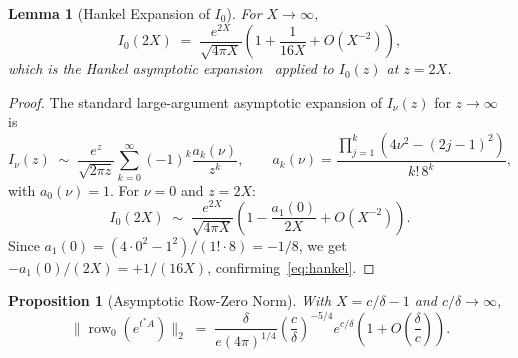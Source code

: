 \documentclass[11pt,reqno]{article}
\theoremstyle{plain}
\newtheorem{lemma}[theorem]{Lemma}
\newtheorem{proposition}[theorem]{Proposition}
\theoremstyle{definition}
\theoremstyle{remark}
\numberwithin{equation}{section}
\begin{document}
\begin{lemma}[Hankel Expansion of $I_0$]\label{lem:hankel}
For $X \to \infty$,
\begin{equation}\label{eq:hankel}
  I_0(2X) \;=\; \frac{e^{2X}}{\sqrt{4\pi X}} \left(1 + \frac{1}{16X} + O(X^{-2})\right),
\end{equation}
which is the Hankel asymptotic expansion~\cite[10.40.1]{DLMF} applied to $I_0(z)$ at $z = 2X$.
\end{lemma}

\begin{proof}
The standard large-argument asymptotic expansion of $I_\nu(z)$ for $z \to \infty$ is~\cite[10.40.1]{DLMF}
\begin{equation}\label{eq:hankelfull}
  I_\nu(z) \;\sim\; \frac{e^z}{\sqrt{2\pi z}} \sum_{k=0}^\infty (-1)^k \frac{a_k(\nu)}{z^k}, \qquad a_k(\nu) = \frac{\prod_{j=1}^k (4\nu^2 - (2j-1)^2)}{k!\,8^k},
\end{equation}
with $a_0(\nu) = 1$. For $\nu = 0$ and $z = 2X$:
\[
  I_0(2X) \;\sim\; \frac{e^{2X}}{\sqrt{4\pi X}} \left(1 - \frac{a_1(0)}{2X} + O(X^{-2})\right).
\]
Since $a_1(0) = (4\cdot 0^2 - 1^2)/(1!\cdot 8) = -1/8$, we get $-a_1(0)/(2X) = +1/(16X)$, confirming~\eqref{eq:hankel}.
\end{proof}

\begin{proposition}[Asymptotic Row-Zero Norm]\label{prop:row0asymp}
With $X = c/\delta - 1$ and $c/\delta \to \infty$,
\begin{equation}\label{eq:row0asymp}
  \bigl\|\operatorname{row}_0\left(e^{t^*A}\right)\bigr\|_2 \;=\; \frac{\delta}{e(4\pi)^{1/4}} \left(\frac{c}{\delta}\right)^{-5/4} e^{c/\delta} \left(1 + O\left(\frac{\delta}{c}\right)\right).
\end{equation}
\end{proposition}
\end{document}
